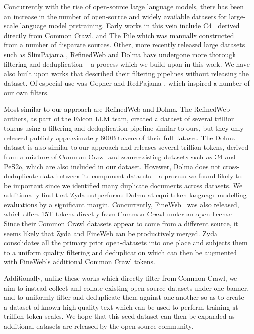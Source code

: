 \documentclass{article}
\begin{document}
Concurrently with the rise of open-source large language models, there has been an increase in the number of open-source and widely available datasets for large-scale language model pretraining. Early works in this vein include C4 \citep{raffel2020exploring}, derived directly from Common Crawl, and The Pile \citep{gao2020pile} which was manually constructed from a number of disparate sources. Other, more recently released large datasets such as SlimPajama \citep{slimpajama}, RefinedWeb \citep{penedo2023refinedweb} and Dolma \citep{soldaini2024dolma} have undergone more thorough filtering and deduplication -- a process which we build upon in this work. We have also built upon works that described their filtering pipelines without releasing the dataset. Of especial use was Gopher \citep{rae2021scaling} and RedPajama \citep{redpajama}, which inspired a number of our own filters. 

Most similar to our approach are RefinedWeb and Dolma. The RefinedWeb authors, as part of the Falcon LLM team, created a dataset of several trillion tokens using a filtering and deduplication pipeline similar to ours, but they only released publicly approximately 600B tokens of their full dataset. The Dolma dataset is also similar to our approach and releases several trillion tokens, derived from a mixture of Common Crawl and some existing datasets such as C4 and PeS2o, which are also included in our dataset. Hovewer, Dolma does not cross-deduplicate data between its component datasets -- a process we found likely to be important since we identified many duplicate documents across datasets. We additionally find that Zyda outperforms Dolma at equi-token language modelling evaluations by a significant margin. Concurrently, FineWeb~\citep{penedo2024fineweb} was also released, which offers 15T tokens directly from Common Crawl under an open license. Since their Common Crawl datasets appear to come from a different source, it seems likely that Zyda and FineWeb can be productively merged. Zyda consolidates all the primary prior open-datasets into one place and subjects them to a uniform quality filtering and deduplication which can then be augmented with FineWeb's additional Common Crawl tokens.

Additionally, unlike these works which directly filter from Common Crawl, we aim to instead collect and collate existing open-source datasets under one banner, and to uniformly filter and deduplicate them against one another so as to create a dataset of known high-quality text which can be used to perform training at trillion-token scales. We hope that this seed dataset can then be expanded as additional datasets are released by the open-source community. 
\end{document}
